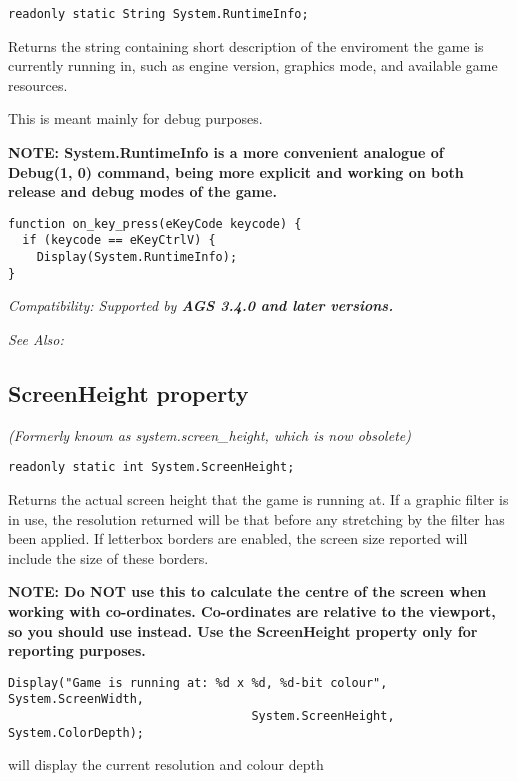 \begin{verbatim}
readonly static String System.RuntimeInfo;
\end{verbatim}
Returns the string containing short description of the enviroment the game is currently
running in, such as engine version, graphics mode, and available game resources.

This is meant mainly for debug purposes.

\bf{NOTE:} System.RuntimeInfo is a more convenient analogue of Debug(1, 0) command,
being more explicit and working on both release and debug modes of the game.

\begin{verbatim}
function on_key_press(eKeyCode keycode) {
  if (keycode == eKeyCtrlV) {
    Display(System.RuntimeInfo);
}
\end{verbatim}

\it{Compatibility:} Supported by \bf{AGS 3.4.0} and later versions.

\it{See Also:} 


\subsection{ScreenHeight property}\label{System.ScreenHeight}%

\it{(Formerly known as system.screen_height, which is now obsolete)}

\begin{verbatim}
readonly static int System.ScreenHeight;
\end{verbatim}
Returns the actual screen height that the game is running at.  If a graphic filter is in
use, the resolution returned will be that before any stretching by the filter has been
applied. If letterbox borders are enabled, the screen size reported will include the size
of these borders.

\bf{NOTE:} Do \bf{NOT} use this to calculate the centre of the screen when working
with co-ordinates. Co-ordinates are relative to the viewport, so you should
use  instead. Use the ScreenHeight
property only for reporting purposes.

\begin{verbatim}
Display("Game is running at: %d x %d, %d-bit colour", System.ScreenWidth,
                                  System.ScreenHeight, System.ColorDepth);
\end{verbatim}
will display the current resolution and colour depth

